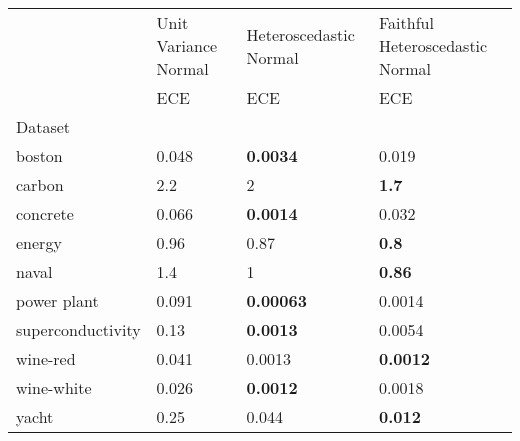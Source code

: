\begin{tabular}{l|l|l|l}
\toprule
 & Unit Variance Normal & Heteroscedastic Normal & Faithful Heteroscedastic Normal \\
 & ECE & ECE & ECE \\
Dataset &  &  &  \\
\midrule
boston & 0.048 & \bfseries 0.0034 & 0.019 \\
carbon & 2.2 & 2 & \bfseries 1.7 \\
concrete & 0.066 & \bfseries 0.0014 & 0.032 \\
energy & 0.96 & 0.87 & \bfseries 0.8 \\
naval & 1.4 & 1 & \bfseries 0.86 \\
power plant & 0.091 & \bfseries 0.00063 & 0.0014 \\
superconductivity & 0.13 & \bfseries 0.0013 & 0.0054 \\
wine-red & 0.041 & 0.0013 & \bfseries 0.0012 \\
wine-white & 0.026 & \bfseries 0.0012 & 0.0018 \\
yacht & 0.25 & 0.044 & \bfseries 0.012 \\
\bottomrule
\end{tabular}
